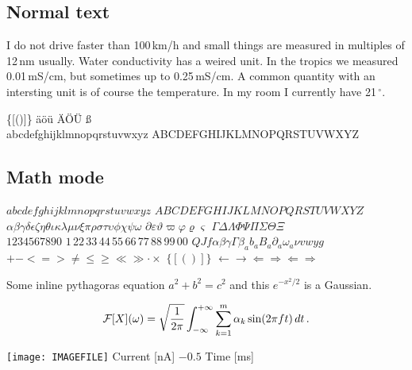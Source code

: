 \subsection{Normal text}

I do not drive faster than 100\,km/h and small things are measured in
multiples of 12\,nm usually. Water conductivity has a weired unit. In
the tropics we measured 0.01\,mS/cm, but sometimes up to
0.25\,mS/cm. A common quantity with an intersting unit is of course
the temperature. In my room I currently have 21\,$^{\circ}$.

\bigskip
{} \qquad \{[()]\} \qquad \"a\"o\"u  \"A\"O\"U {\ss} \\
abcdefghijklmnopqrstuvwxyz \qquad ABCDEFGHIJKLMNOPQRSTUVWXYZ

\subsection{Math mode}

$abcdefghijklmnopqrstuvwxyz$ \qquad
$ABCDEFGHIJKLMNOPQRSTUVWXYZ$\\
$\alpha\beta\gamma\delta\epsilon\zeta\eta\theta\iota\kappa\lambda\mu\nu\xi\pi\rho\sigma\tau\upsilon\phi\chi\psi\omega$ \qquad
$\partial\varepsilon\vartheta\varpi\varphi\varrho\varsigma$ \qquad
$\Gamma\Delta\Lambda\Phi\Psi\Pi\Sigma\Theta\Xi$\\
$1234567890$ $1$\,2$2$\,3$3$\,4$4$\,5$5$\,6$6$\,7$7$\,8$8$\,9$9$\,0$0$ \qquad
$QJf \alpha \beta \gamma \Gamma \beta_a b_a B_a \partial_a \omega_a \nu vwyg$ \\
$+ - <=> \ne \le \ge \ll \gg \cdot \times$ \qquad
$\{[()]\}$ \qquad
$\leftarrow \rightarrow \Leftarrow \Rightarrow \Longleftarrow \Longrightarrow$

\bigskip
\noindent
Some inline pythagoras equation $a^2 + b^2 = c^2$ and this $e^{-x^2/2}$ is a Gaussian.

\[ {\cal F}[X](\omega) = \sqrt{\frac{1}{2\pi}}\int_{-\infty}^{+\infty} \sum_{k=1}^m \alpha_k\sin(2\pi f t)\,dt\,. \]

\noindent
\texttt{[image: IMAGEFILE]}
Current [nA] \qquad $-0.5$   \qquad Time [ms]
